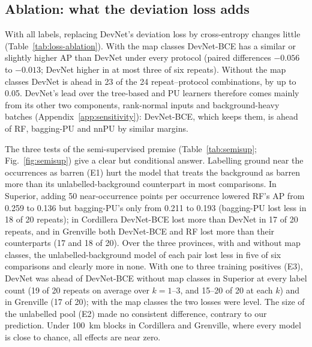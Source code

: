 \documentclass[pdflatex,sn-apa]{sn-jnl}
\begin{document}
\subsection{Ablation: what the deviation loss adds}\label{sec:res-ablation}

With all labels, replacing DevNet's deviation loss by cross-entropy changes little (Table~\ref{tab:loss-ablation}). With the map classes DevNet-BCE has a similar or slightly higher AP than DevNet under every protocol (paired differences $-0.056$ to $-0.013$; DevNet higher in at most three of six repeats). Without the map classes DevNet is ahead in 23 of the 24 repeat--protocol combinations, by up to 0.05. DevNet's lead over the tree-based and PU learners therefore comes mainly from its other two components, rank-normal inputs and background-heavy batches (Appendix~\ref{app:sensitivity}): DevNet-BCE, which keeps them, is ahead of RF, bagging-PU and nnPU by similar margins.

The three tests of the semi-supervised premise (Table~\ref{tab:semisup}; Fig.~\ref{fig:semisup}) give a clear but conditional answer. Labelling ground near the occurrences as barren (E1) hurt the model that treats the background as barren more than its unlabelled-background counterpart in most comparisons. In Superior, adding 50 near-occurrence points per occurrence lowered RF's AP from 0.259 to 0.136 but bagging-PU's only from 0.211 to 0.193 (bagging-PU lost less in 18 of 20 repeats); in Cordillera DevNet-BCE lost more than DevNet in 17 of 20 repeats, and in Grenville both DevNet-BCE and RF lost more than their counterparts (17 and 18 of 20). Over the three provinces, with and without map classes, the unlabelled-background model of each pair lost less in five of six comparisons and clearly more in none. With one to three training positives (E3), DevNet was ahead of DevNet-BCE without map classes in Superior at every label count (19 of 20 repeats on average over $k = 1$--3, and 15--20 of 20 at each $k$) and in Grenville (17 of 20); with the map classes the two losses were level. The size of the unlabelled pool (E2) made no consistent difference, contrary to our prediction. Under 100~km blocks in Cordillera and Grenville, where every model is close to chance, all effects are near zero.
\end{document}
